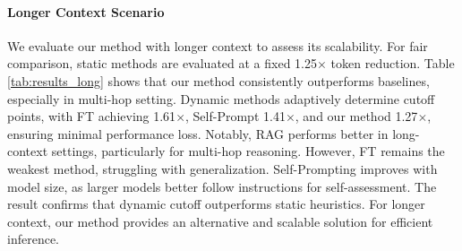 \paragraph{Longer Context Scenario}
\label{sec:context_length}
We evaluate our method with longer context to assess its scalability. For fair comparison, static methods are evaluated at a fixed 1.25$\times$ token reduction.  
Table \ref{tab:results_long} shows that our method consistently outperforms baselines, especially in multi-hop setting. Dynamic methods adaptively determine cutoff points, with FT achieving 1.61$\times$, Self-Prompt 1.41$\times$, and our method 1.27$\times$, ensuring minimal performance loss. Notably, RAG performs better in long-context settings, particularly for multi-hop reasoning. However, FT remains the weakest method, struggling with generalization. Self-Prompting improves with model size, as larger models better follow instructions for self-assessment. The result confirms that dynamic cutoff outperforms static heuristics. For longer context, our method provides an alternative and scalable solution for efficient inference.

